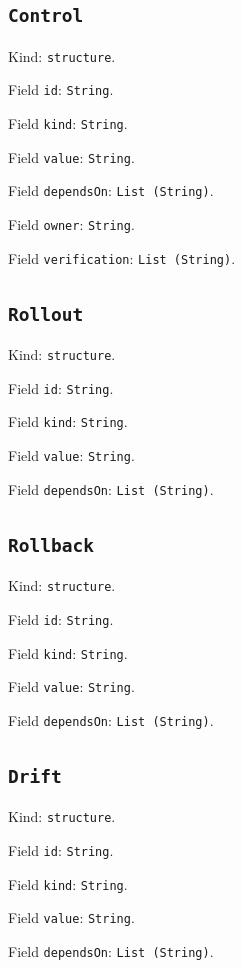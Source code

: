 \documentclass[11pt]{article}
\begin{document}
\subsection*{\texttt{Control}}
\noindent Kind: \texttt{structure}.\par
\noindent Field \texttt{id}: \texttt{String}.\par
\noindent Field \texttt{kind}: \texttt{String}.\par
\noindent Field \texttt{value}: \texttt{String}.\par
\noindent Field \texttt{dependsOn}: \texttt{List (String)}.\par
\noindent Field \texttt{owner}: \texttt{String}.\par
\noindent Field \texttt{verification}: \texttt{List (String)}.\par
\subsection*{\texttt{Rollout}}
\noindent Kind: \texttt{structure}.\par
\noindent Field \texttt{id}: \texttt{String}.\par
\noindent Field \texttt{kind}: \texttt{String}.\par
\noindent Field \texttt{value}: \texttt{String}.\par
\noindent Field \texttt{dependsOn}: \texttt{List (String)}.\par
\subsection*{\texttt{Rollback}}
\noindent Kind: \texttt{structure}.\par
\noindent Field \texttt{id}: \texttt{String}.\par
\noindent Field \texttt{kind}: \texttt{String}.\par
\noindent Field \texttt{value}: \texttt{String}.\par
\noindent Field \texttt{dependsOn}: \texttt{List (String)}.\par
\subsection*{\texttt{Drift}}
\noindent Kind: \texttt{structure}.\par
\noindent Field \texttt{id}: \texttt{String}.\par
\noindent Field \texttt{kind}: \texttt{String}.\par
\noindent Field \texttt{value}: \texttt{String}.\par
\noindent Field \texttt{dependsOn}: \texttt{List (String)}.\par
\end{document}

